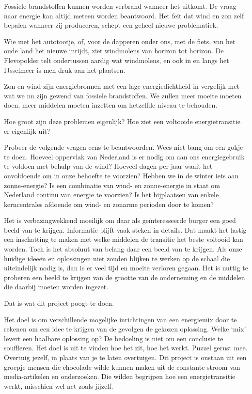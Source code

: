 \documentclass[
  11pt,
  a4paper,
]{book}
\begin{document}
Fossiele brandstoffen kunnen worden verbrand wanneer het uitkomt. De vraag naar energie kan altijd meteen worden beantwoord. Het feit dat wind en zon zelf bepalen wanneer zij produceren, schept een geheel nieuwe problematiek.

Wie met het autotootje, of, voor de dapperen onder ons, met de fiets, van het oude land het nieuwe inrijdt, ziet windmolens van horizon tot horizon. De Flevopolder telt ondertussen aardig wat windmolens, en ook in en langs het IJsselmeer is men druk aan het plaatsen.

Zon en wind zijn energiebronnen met een lage energiedichtheid in vergelijk met wat we nu zijn gewend van fossiele brandstoffen. We zullen meer moeite moeten doen, meer middelen moeten inzetten om hetzelfde niveau te behouden.

Hoe groot zijn deze problemen eigenlijk? Hoe ziet een voltooide energietransitie er eigenlijk uit?

Probeer de volgende vragen eens te beantwoorden. Wees niet bang om een gokje te doen. Hoeveel oppervlak van Nederland is er nodig om aan ons energiegebruik te voldoen met behulp van de wind? Hoeveel dagen per jaar waait het onvoldoende om in onze behoefte te voorzien? Hebben we in de winter iets aan zonne-energie? Is een combinatie van wind- en zonne-energie in staat om Nederland continu van energie te voorzien? Is het bijplaatsen van enkele kerncentrales afdoende om wind- en zonarme perioden door te komen?

Het is verbazingwekkend moeilijk om daar als geïnteresseerde burger een goed beeld van te krijgen. Informatie blijft vaak steken in details. Dat maakt het lastig een inschatting te maken met welke middelen de transitie het beste voltooid kan worden. Toch is het absoluut van belang daar een beeld van te krijgen. Als onze huidige ideeën en oplossingen niet zouden blijken te werken op de schaal die uiteindelijk nodig is, dan is er veel tijd en moeite verloren gegaan. Het is nuttig te proberen een beeld te krijgen van de grootte van de onderneming en de middelen die daarbij moeten worden ingezet.

Dat is wat dit project poogt te doen.

Het doel is om verschillende mogelijke inrichtingen van een energiemix door te rekenen om een idee te krijgen van de gevolgen de gekozen oplossing. Welke `mix' levert een haalbare oplossing op? De bedoeling is niet om een conclusie te souffleren. Het doel is uit te vinden hoe het zit, hoe het werkt. Puzzel gerust mee. Overtuig jezelf, in plaats van je te laten overtuigen. Dit project is onstaan uit een groepje mensen die chocolade wilde kunnen maken uit de constante stroom van media-artikelen en onderzoeken. Die wilden begrijpen hoe een energietransitie werkt, misschien wel net zoals jijzelf.
\end{document}
